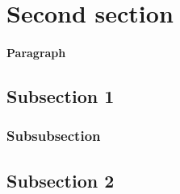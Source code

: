 \section{Second section}
\lipsum[9-10]

\paragraph{Paragraph} \lipsum[17-18]

\subsection{Subsection 1}
\lipsum[11-12]

\subsubsection{Subsubsection}
\lipsum[13-14]

\subsection{Subsection 2}
\lipsum[14-16]
